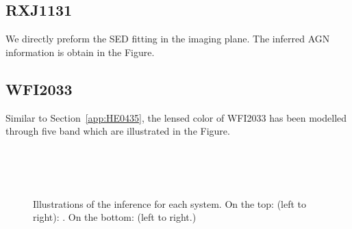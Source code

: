 \documentclass[fleqn,usenatbib]{mnras}
\begin{document}
\subsection{RXJ1131}\label{app:RXJ1131}
We directly preform the SED fitting in the imaging plane. The inferred AGN information is obtain in the Figure.


\subsection{WFI2033}\label{app:WFI2033}
Similar to Section~\ref{app:HE0435}, the lensed color of WFI2033 has been modelled through five band which are illustrated in the Figure.

\begin{figure}
\centering
{}\\
\\
\\
\caption{\label{fig:app_WFI2033} 
Illustrations of the inference for each system. On the top: (left to right): . On the bottom: (left to right.) }
\end{figure} 


\bsp	%
\label{lastpage}
\end{document}
